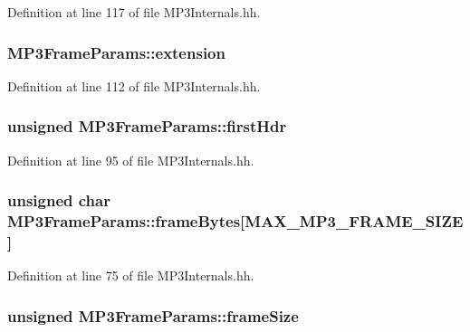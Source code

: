 Definition at line 117 of file M\+P3\+Internals.\+hh.

\subsubsection[{extension}]{ M\+P3\+Frame\+Params\+::extension\hspace{0.3cm}{\ttfamily [private]}}\label{classMP3FrameParams_a5fb8c5ef97a8bf2f157dce1aeedcf1bd}


Definition at line 112 of file M\+P3\+Internals.\+hh.

\subsubsection[{first\+Hdr}]{\setlength{\rightskip}{0pt plus 5cm}unsigned M\+P3\+Frame\+Params\+::first\+Hdr}\label{classMP3FrameParams_aa841ac2404d5bcf9d9e148370e1c4dfd}


Definition at line 95 of file M\+P3\+Internals.\+hh.

\subsubsection[{frame\+Bytes}]{\setlength{\rightskip}{0pt plus 5cm}unsigned char M\+P3\+Frame\+Params\+::frame\+Bytes[{\bf M\+A\+X\+\_\+\+M\+P3\+\_\+\+F\+R\+A\+M\+E\+\_\+\+S\+I\+Z\+E}]}\label{classMP3FrameParams_a33684180c7b54c0bbcbce744a7eb660e}


Definition at line 75 of file M\+P3\+Internals.\+hh.

\subsubsection[{frame\+Size}]{\setlength{\rightskip}{0pt plus 5cm}unsigned M\+P3\+Frame\+Params\+::frame\+Size}\label{classMP3FrameParams_a77f9793f6129ef823c6e4dfa432d30c6}


